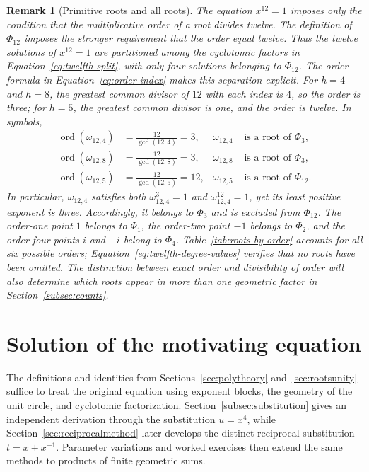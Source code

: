 \documentclass[11pt,a4paper]{article}
\numberwithin{equation}{section}
\theoremstyle{uprightpaper}
\newtheorem{remark}{Remark}[section]
\newcommand{\ord}{\operatorname{ord}}
\begin{document}
\begin{remark}[Primitive roots and all roots]\label{rem:primitive-distinction}
The equation $x^{12}=1$ imposes only the condition that the
multiplicative order of a root divides twelve. The definition of
$\Phi_{12}$ imposes the stronger requirement that the order equal
twelve. Thus the twelve solutions of $x^{12}=1$ are partitioned
among the cyclotomic factors in Equation~\eqref{eq:twelfth-split}, with
only four solutions belonging to $\Phi_{12}$. The order formula
in Equation~\eqref{eq:order-index} makes this separation explicit.
For $h=4$ and $h=8$, the greatest common divisor of $12$ with each index
is $4$, so the order is three; for $h=5$, the greatest common
divisor is one, and the order is twelve. In symbols,
\begin{align}
 \ord(\omega_{12,4})&=\frac{12}{\gcd(12,4)}=3,
 &\omega_{12,4}&\text{ is a root of }\Phi_3,\label{eq:three-vs-twelve-four}\\
 \ord(\omega_{12,8})&=\frac{12}{\gcd(12,8)}=3,
 &\omega_{12,8}&\text{ is a root of }\Phi_3,\label{eq:three-vs-twelve}\\
 \ord(\omega_{12,5})&=\frac{12}{\gcd(12,5)}=12,
 &\omega_{12,5}&\text{ is a root of }\Phi_{12}.\label{eq:three-vs-twelve-five}
\end{align}
In particular, $\omega_{12,4}$ satisfies both $\omega_{12,4}^3=1$
and $\omega_{12,4}^{12}=1$, yet its least positive exponent is three.
Accordingly, it belongs to $\Phi_3$ and is excluded from $\Phi_{12}$.
The order-one point $1$ belongs to $\Phi_1$, the order-two point
$-1$ belongs to $\Phi_2$, and the order-four points $i$ and $-i$
belong to $\Phi_4$. Table~\ref{tab:roots-by-order} accounts for all
six possible orders; Equation~\eqref{eq:twelfth-degree-values} verifies
that no roots have been omitted. The distinction between exact order
and divisibility of order will also determine which roots appear in
more than one geometric factor in Section~\ref{subsec:counts}.
\end{remark}
\section{Solution of the motivating equation}\label{sec:applications}

The definitions and identities from Sections~\ref{sec:polytheory} and~\ref{sec:rootsunity} suffice to treat the original equation using exponent blocks, the geometry of the unit circle, and cyclotomic factorization. Section~\ref{subsec:substitution} gives an independent derivation through the substitution $u=x^4$, while Section~\ref{sec:reciprocalmethod} later develops the distinct reciprocal substitution $t=x+x^{-1}$. Parameter variations and worked exercises then extend the same methods to products of finite geometric sums.
\end{document}
